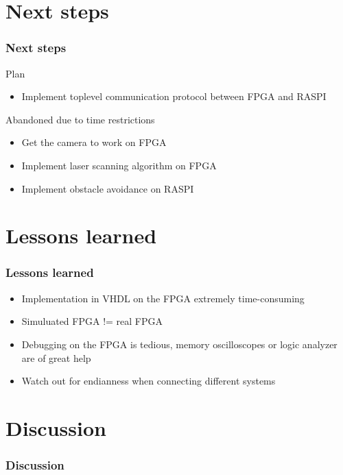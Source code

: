 \documentclass[pdf]{beamer}
\begin{document}
\section{Next steps}
\begin{frame}
\frametitle{Next steps}
\begin{exampleblock}{Plan}
\begin{itemize}
\item Implement toplevel communication protocol between FPGA and RASPI
\end{itemize}
\end{exampleblock}
\begin{alertblock}{Abandoned due to time restrictions}
\begin{itemize}
\item Get the camera to work on FPGA 
\item Implement laser scanning algorithm on FPGA
\item Implement obstacle avoidance on RASPI
\end{itemize}
\end{alertblock}
\end{frame}

\section{Lessons learned}
\begin{frame}
\frametitle{Lessons learned}
\begin{exampleblock}{}
\begin{itemize}
\item Implementation in VHDL on the FPGA extremely time-consuming
\item Simuluated FPGA != real FPGA
\item Debugging on the FPGA is tedious, memory oscilloscopes or logic analyzer are of great help  
\item Watch out for endianness when connecting different systems
\end{itemize}
\end{exampleblock}
\end{frame}

\section{Discussion}
\begin{frame}
\frametitle{Discussion}
\end{frame}
\end{document}
